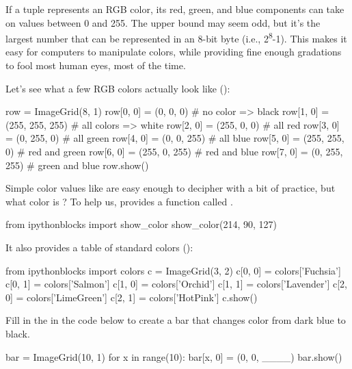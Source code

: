 If a tuple represents an RGB color, its red, green, and blue components
can take on values between 0 and 255. The upper bound may seem odd, but
it's the largest number that can be represented in an 8-bit byte (i.e.,
2\textsuperscript{8}-1). This makes it easy for computers to manipulate
colors, while providing fine enough gradations to fool most human eyes,
most of the time.

Let's see what a few RGB colors actually look like ():

\begin{VerbIn}
row = ImageGrid(8, 1)
row[0, 0] = (0, 0, 0)   # no color => black
row[1, 0] = (255, 255, 255) # all colors => white
row[2, 0] = (255, 0, 0) # all red
row[3, 0] = (0, 255, 0) # all green
row[4, 0] = (0, 0, 255) # all blue
row[5, 0] = (255, 255, 0) # red and green
row[6, 0] = (255, 0, 255) # red and blue
row[7, 0] = (0, 255, 255) # green and blue
row.show()
\end{VerbIn}


Simple color values like  are easy enough to decipher
with a bit of practice, but what color is ? To help
us,  provides a function called
.

\begin{VerbIn}
from ipythonblocks import show_color
show_color(214, 90, 127)
\end{VerbIn}

It also provides a table of standard colors ():

\begin{VerbIn}
from ipythonblocks import colors
c = ImageGrid(3, 2)
c[0, 0] = colors['Fuchsia']
c[0, 1] = colors['Salmon']
c[1, 0] = colors['Orchid']
c[1, 1] = colors['Lavender']
c[2, 0] = colors['LimeGreen']
c[2, 1] = colors['HotPink']
c.show()
\end{VerbIn}


\begin{challenge}
  Fill in the \code{\_\_\_\_} in the code below to create a bar that
  changes color from dark blue to black.

\begin{VerbIn}
bar = ImageGrid(10, 1)
for x in range(10):
    bar[x, 0] = (0, 0, ____)
bar.show()
\end{VerbIn}
\end{challenge}

